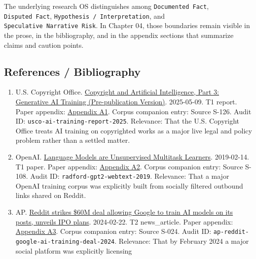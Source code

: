 \documentclass[
  american,
  11pt,
  letterpaper,
]{article}
\providecommand{\tightlist}{%
  \setlength{\itemsep}{0pt}\setlength{\parskip}{0pt}}
\begin{document}
The underlying research OS distinguishes among
\texttt{Documented\ Fact}, \texttt{Disputed\ Fact},
\texttt{Hypothesis\ /\ Interpretation}, and
\texttt{Speculative\ Narrative\ Risk}. In Chapter 04, those boundaries
remain visible in the prose, in the bibliography, and in the appendix
sections that summarize claims and caution points.

\subsection{References / Bibliography}\label{references-bibliography}

\begin{enumerate}
\def\labelenumi{\arabic{enumi}.}
\tightlist
\item
  U.S. Copyright Office.
  \href{https://copyright.gov/ai/Copyright-and-Artificial-Intelligence-Part-3-Generative-AI-Training-Report-Pre-Publication-Version.pdf}{Copyright
  and Artificial Intelligence, Part 3: Generative AI Training
  (Pre-publication Version)}. 2025-05-09. T1 report. Paper appendix:
  \hyperref[appendix-a1-copyright-and-artificial-intelligence-part-3-generative-ai-training-pre-publication-version]{Appendix
  A1}. Corpus companion entry: Source S-126. Audit ID:
  \texttt{usco-ai-training-report-2025}. Relevance: That the U.S.
  Copyright Office treats AI training on copyrighted works as a major
  live legal and policy problem rather than a settled matter.
\item
  OpenAI.
  \href{https://cdn.openai.com/better-language-models/language_models_are_unsupervised_multitask_learners.pdf}{Language
  Models are Unsupervised Multitask Learners}. 2019-02-14. T1 paper.
  Paper appendix:
  \hyperref[appendix-a2-language-models-are-unsupervised-multitask-learners]{Appendix
  A2}. Corpus companion entry: Source S-108. Audit ID:
  \texttt{radford-gpt2-webtext-2019}. Relevance: That a major OpenAI
  training corpus was explicitly built from socially filtered outbound
  links shared on Reddit.
\item
  AP.
  \href{https://apnews.com/article/a7f131c7cb4225307134ef21d3c6a708}{Reddit
  strikes \$60M deal allowing Google to train AI models on its posts,
  unveils IPO plans}. 2024-02-22. T2 news\_article. Paper appendix:
  \hyperref[appendix-a3-reddit-strikes-60m-deal-allowing-google-to-train-ai-models-on-its-posts-unveils-ipo-plans]{Appendix
  A3}. Corpus companion entry: Source S-024. Audit ID:
  \texttt{ap-reddit-google-ai-training-deal-2024}. Relevance: That by
  February 2024 a major social platform was explicitly licensing

\end{enumerate}
\end{document}
